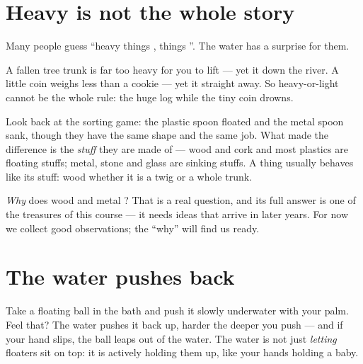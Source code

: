 \section{Heavy is not the whole story}

Many people guess ``heavy things ,  things ''. The
water has a surprise for them.

\begin{example}\label{ex:g1:floating-and-sinking:log}
A fallen tree trunk is far too heavy for you to lift --- yet it
 down the river. A little coin weighs less than a cookie ---
yet it  straight away. So heavy-or-light cannot be the whole
rule: the huge log  while the tiny coin drowns.
\end{example}

\begin{example}\label{ex:g1:floating-and-sinking:stuff}
Look back at the sorting game: the plastic spoon floated and the
metal spoon sank, though they have the same shape and the same job.
What made the difference is the \emph{stuff} they are made of ---
wood and cork and most plastics are floating stuffs; metal, stone and
glass are sinking stuffs. A thing usually behaves like its stuff:
wood  whether it is a twig or a whole trunk.
\end{example}

\begin{remark}\label{rem:g1:floating-and-sinking:why}
\emph{Why} does wood  and metal ? That is a real question,
and its full answer is one of the treasures of this course --- it
needs ideas that arrive in later years. For now we collect good
observations; the ``why'' will find us ready.
\end{remark}

\section{The water pushes back}

\begin{example}\label{ex:g1:floating-and-sinking:push}
Take a floating ball in the bath and push it slowly underwater with
your palm. Feel that? The water pushes it back up, harder the deeper
you push --- and if your hand slips, the ball leaps out of the water.
The water is not just \emph{letting} floaters sit on top: it is
actively holding them up, like your hands holding a baby.
\end{example}

